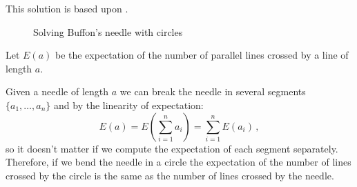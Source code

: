  This solution is based upon \cite[Chapter~26]{proofs}.

\begin{figure}[tb]
\begin{center}
\end{center}
\caption{Solving Buffon's needle with circles}\label{f.buffon3}
\end{figure}

Let $E(a)$ be the expectation of the number of parallel lines crossed by a line of length $a$.

Given a needle of length $a$ we can break the needle in several segments $\{a_1,\ldots,a_n\}$ and by the linearity of expectation:
\[
E(a) = E\left(\sum_{i=1}^{n} a_i\right) = \sum_{i=1}^{n} E(a_i)\,, 
\]
so it doesn't matter if we compute the expectation of each segment separately. Therefore, if we bend the needle in a circle the expectation of the number of lines crossed by the circle is the same as the number of lines crossed by the needle.

